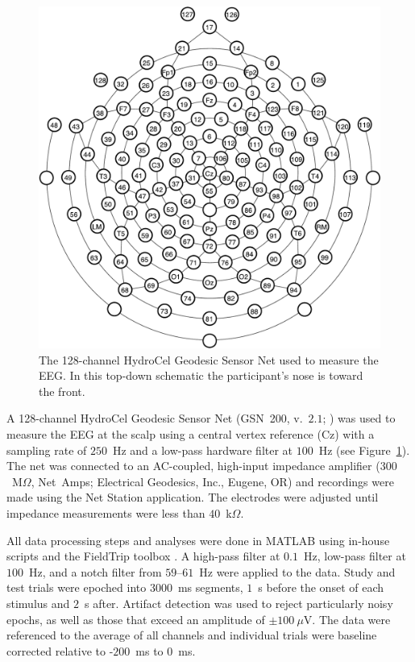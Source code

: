 \begin{figure}
  \centering
  \includegraphics[width=.40\textwidth]{./figs/hcgsn_full}
  \caption{The 128-channel HydroCel Geodesic Sensor
    Net\texttrademark{} used to measure the EEG.  In this top-down schematic the participant's nose is toward the front.}
  \label{fig:roi}
\end{figure}

A 128-channel HydroCel Geodesic Sensor Net\texttrademark{} (GSN~200, v.~$2.1$; ) was used to measure the EEG at the scalp using a central vertex reference (Cz) with a sampling rate of $250$~Hz and a low-pass hardware filter at $100$~Hz (see Figure~\ref{fig:roi}).  The net was connected to an AC-coupled, high-input impedance amplifier ($300$~M$\Omega$, Net~Amps\texttrademark{}; Electrical Geodesics, Inc., Eugene, OR) and recordings were made using the Net Station application.  The electrodes were adjusted until impedance measurements were less than $40$~k$\Omega$.

All data processing steps and analyses were done in MATLAB using in-house scripts \cite{mat-mvm}
and the FieldTrip toolbox \cite{OostEtal2011}.  A high-pass filter at $0.1$~Hz, low-pass filter at $100$~Hz, and a notch filter from $59$--$61$~Hz were applied to the data.  Study and test trials were epoched into $3000$~ms segments, $1$~s before the onset of each stimulus and $2$~s after.  Artifact detection was used to reject particularly noisy epochs, as well as those that exceed an amplitude of $\pm100~\mu$V.  The data were referenced to the average of all channels and individual trials were baseline corrected relative to -$200$~ms to $0$~ms.


